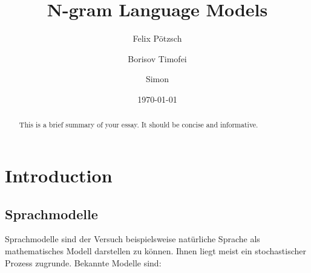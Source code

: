 \documentclass[12pt]{article}
\title{N-gram Language Models}
\author{
  Felix Pötzsch\\
  \and
  Borisov Timofei \\
  \and
  Simon \\
}
\date{\today}
\begin{document}
\maketitle

\begin{abstract}
	This is a brief summary of your essay. It should be concise and informative.
\end{abstract}

\tableofcontents
\clearpage

\section{Introduction}

\subsection{Sprachmodelle}
Sprachmodelle sind der Versuch beispielsweise natürliche Sprache als mathematisches 
Modell darstellen zu können. Ihnen liegt meist ein stochastischer Prozess zugrunde. 
Bekannte Modelle sind:
\end{document}
